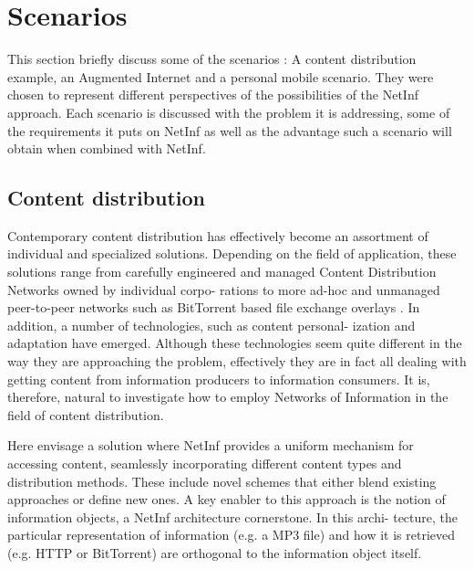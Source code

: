 
\chapter{Scenarios}
This section briefly discuss some of the scenarios : A content distribution
example, an Augmented Internet and a personal mobile scenario. They were chosen to
represent different perspectives of the possibilities of the NetInf approach. Each scenario is
discussed with the problem it is addressing, some of the requirements it puts on NetInf as well
as the advantage such a scenario will obtain when combined with NetInf.

\section{Content distribution}

Contemporary content distribution has effectively become an assortment of individual and
specialized solutions. Depending on the field of application, these solutions range from
carefully engineered and managed Content Distribution Networks owned by individual corpo-
rations to more ad-hoc and unmanaged peer-to-peer networks such as BitTorrent based
file exchange overlays . In addition, a number of technologies, such as content personal-
ization and adaptation have emerged. Although these technologies seem quite different in the
way they are approaching the problem, effectively they are in fact all dealing with getting
content from information producers to information consumers. It is, therefore, natural to
investigate how to employ Networks of Information in the field of content distribution.

Here envisage a solution where NetInf provides a uniform mechanism for accessing content,
seamlessly incorporating different content types and distribution methods. These include
novel schemes that either blend existing approaches or define new ones. A key enabler to this
approach is the notion of information objects, a NetInf architecture cornerstone. In this archi-
tecture, the particular representation of information (e.g. a MP3 file) and how it is retrieved
(e.g. HTTP or BitTorrent) are orthogonal to the information object itself.

